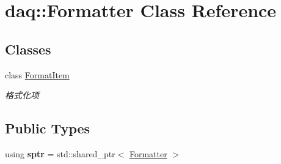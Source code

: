 \hypertarget{classdaq_1_1Formatter}{}\section{daq\+:\+:Formatter Class Reference}
\label{classdaq_1_1Formatter}
\subsection*{Classes}
\begin{DoxyCompactItemize}
\item 
class \hyperlink{classdaq_1_1Formatter_1_1FormatItem}{Format\+Item}
\begin{DoxyCompactList}\small\item\em 格式化项 \end{DoxyCompactList}\end{DoxyCompactItemize}
\subsection*{Public Types}
\begin{DoxyCompactItemize}
\item 
\mbox{\label{classdaq_1_1Formatter_ae857cb199ddfdafbc9bfa3204d25d4b5}} 
using {\bfseries sptr} = std\+::shared\+\_\+ptr$<$ \hyperlink{classdaq_1_1Formatter}{Formatter} $>$
\end{DoxyCompactItemize}
